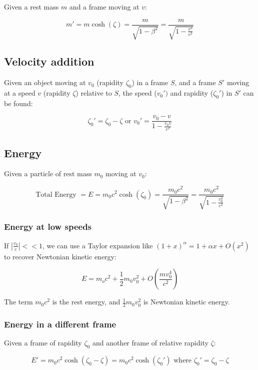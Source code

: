 \documentclass[12pt]{article}
\begin{document}
Given a rest mass $m$ and a frame moving at $v$:

\[
\boxed{
m' = m\cosh(\zeta) = \frac{m}{\sqrt{1 - \beta^2}} = \frac{m}{\sqrt{1 - \frac{v^2}{c^2}}}
}
\]

\subsection{Velocity addition}

Given an object moving at $v_0$ (rapidity $\zeta_0$) in a frame $S$, and a frame $S'$ moving at a speed $v$ (rapidity $\zeta$) relative to $S$, the speed ($v_0')$ and rapidity ($\zeta_0'$) in $S'$ can be found:

\[
\boxed{
\zeta_0' = \zeta_0 - \zeta
} \text{ or } 
\boxed{
v_0' = \frac{v_0 - v}{1 - \frac{v_0 v}{c^2}}
}
\]

\newpage

\subsection{Energy}

Given a particle of rest mass $m_0$ moving at $v_0$:

\[
\boxed{
\text{Total Energy } = E = m_0 c^2 \cosh(\zeta_0) = \frac{m_0 c^2}{\sqrt{1 - \beta^2}} = \frac{m_0 c^2}{\sqrt{1 - \frac{v_0^2}{c^2}}}
}
\]

\subsubsection{Energy at low speeds}

If $\left|\frac{v_0}{c}\right| << 1$, we can use a Taylor expansion like $(1 + x)^\alpha = 1 + \alpha x + O(x^2)$ to recover Newtonian kinetic energy:

\[
\boxed{
E = m_o c^2 + \frac{1}{2}m_0 v_0^2 + O\left(\frac{mv_0^4}{c^2}\right)
}
\]

The term $m_0 c^2$ is the rest energy, and $\frac{1}{2}m_0v_0^2$ is Newtonian kinetic energy.

\subsubsection{Energy in a different frame}

Given a frame of rapidity $\zeta_0$ and another frame of relative rapidity $\zeta$:

\[
\boxed{
E' = m_0 c^2 \cosh(\zeta_0 - \zeta) = m_0 c^2 \cosh(\zeta_0')}\text{ where } \zeta_0' = \zeta_0 - \zeta
\]
\end{document}
